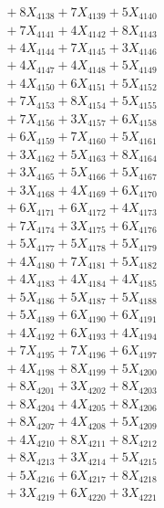 \documentclass[a4paper,10pt]{article}
\begin{document}
{\begin{align}
&\;  + 8 X_{4138} + 7 X_{4139} + 5 X_{4140} \\[0.3ex]
&\;  + 7 X_{4141} + 4 X_{4142} + 8 X_{4143} \\[0.3ex]
&\;  + 4 X_{4144} + 7 X_{4145} + 3 X_{4146} \\[0.3ex]
&\;  + 4 X_{4147} + 4 X_{4148} + 5 X_{4149} \\[0.5ex]\allowbreak
&\;  + 4 X_{4150} + 6 X_{4151} + 5 X_{4152} \\[0.3ex]
&\;  + 7 X_{4153} + 8 X_{4154} + 5 X_{4155} \\[0.3ex]
&\;  + 7 X_{4156} + 3 X_{4157} + 6 X_{4158} \\[0.3ex]
&\;  + 6 X_{4159} + 7 X_{4160} + 5 X_{4161} \\[0.3ex]
&\;  + 3 X_{4162} + 5 X_{4163} + 8 X_{4164} \\[0.3ex]
&\;  + 3 X_{4165} + 5 X_{4166} + 5 X_{4167} \\[0.3ex]
&\;  + 3 X_{4168} + 4 X_{4169} + 6 X_{4170} \\[0.3ex]
&\;  + 6 X_{4171} + 6 X_{4172} + 4 X_{4173} \\[0.3ex]
&\;  + 7 X_{4174} + 3 X_{4175} + 6 X_{4176} \\[0.3ex]
&\;  + 5 X_{4177} + 5 X_{4178} + 5 X_{4179} \\[0.5ex]\allowbreak
&\;  + 4 X_{4180} + 7 X_{4181} + 5 X_{4182} \\[0.3ex]
&\;  + 4 X_{4183} + 4 X_{4184} + 4 X_{4185} \\[0.3ex]
&\;  + 5 X_{4186} + 5 X_{4187} + 5 X_{4188} \\[0.3ex]
&\;  + 5 X_{4189} + 6 X_{4190} + 6 X_{4191} \\[0.3ex]
&\;  + 4 X_{4192} + 6 X_{4193} + 4 X_{4194} \\[0.3ex]
&\;  + 7 X_{4195} + 7 X_{4196} + 6 X_{4197} \\[0.3ex]
&\;  + 4 X_{4198} + 8 X_{4199} + 5 X_{4200} \\[0.3ex]
&\;  + 8 X_{4201} + 3 X_{4202} + 8 X_{4203} \\[0.3ex]
&\;  + 8 X_{4204} + 4 X_{4205} + 8 X_{4206} \\[0.3ex]
&\;  + 8 X_{4207} + 4 X_{4208} + 5 X_{4209} \\[0.5ex]\allowbreak
&\;  + 4 X_{4210} + 8 X_{4211} + 8 X_{4212} \\[0.3ex]
&\;  + 8 X_{4213} + 3 X_{4214} + 5 X_{4215} \\[0.3ex]
&\;  + 5 X_{4216} + 6 X_{4217} + 8 X_{4218} \\[0.3ex]
&\;  + 3 X_{4219} + 6 X_{4220} + 3 X_{4221} \\[0.3ex]

\end{align}}
\end{document}
